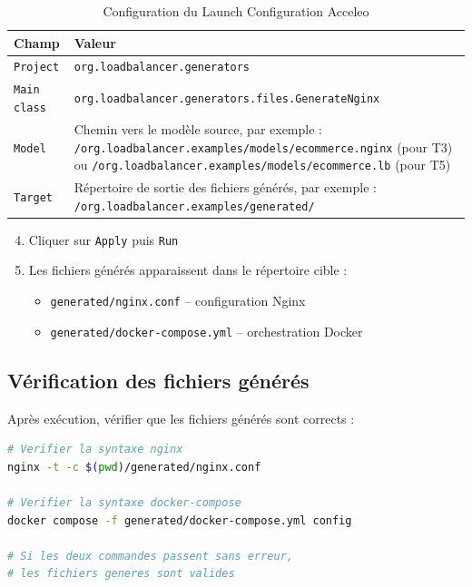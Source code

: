 \documentclass[12pt,a4paper]{report}
\begin{document}
\begin{table}[H]
\centering
\caption{Configuration du Launch Configuration Acceleo}
\begin{tabular}{|p{4cm}|p{9cm}|}
\hline
\textbf{Champ} & \textbf{Valeur} \\
\hline
\texttt{Project} & \texttt{org.loadbalancer.generators} \\
\hline
\texttt{Main class} & \texttt{org.loadbalancer.generators.files.GenerateNginx} \\
\hline
\texttt{Model} & Chemin vers le modèle source, par exemple : \texttt{/org.loadbalancer.examples/models/ecommerce.nginx} (pour T3) ou \texttt{/org.loadbalancer.examples/models/ecommerce.lb} (pour T5) \\
\hline
\texttt{Target} & Répertoire de sortie des fichiers générés, par exemple : \texttt{/org.loadbalancer.examples/generated/} \\
\hline
\end{tabular}
\end{table}

\begin{enumerate}
  \setcounter{enumi}{3}
  \item Cliquer sur \texttt{Apply} puis \texttt{Run}
  \item Les fichiers générés apparaissent dans le répertoire cible :
    \begin{itemize}
      \item \texttt{generated/nginx.conf} -- configuration Nginx
      \item \texttt{generated/docker-compose.yml} -- orchestration Docker
    \end{itemize}
\end{enumerate}

\subsection{Vérification des fichiers générés}

Après exécution, vérifier que les fichiers générés sont corrects :

\begin{lstlisting}[language=bash, caption={Vérification des fichiers générés}]
# Verifier la syntaxe nginx
nginx -t -c $(pwd)/generated/nginx.conf

# Verifier la syntaxe docker-compose
docker compose -f generated/docker-compose.yml config

# Si les deux commandes passent sans erreur,
# les fichiers generes sont valides
\end{lstlisting}
\end{document}
